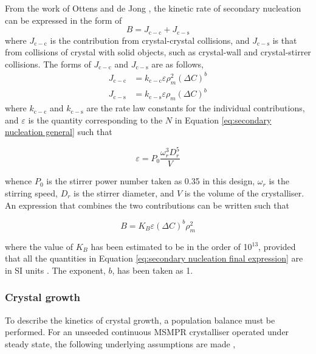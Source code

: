 From the work of Ottens and de Jong \cite{ottens_model_1974}, the kinetic rate of secondary nucleation can be expressed in the form of 
\begin{equation}
    B = J_{\mathrm{c-c}} + J_{\mathrm{c-s}}
\end{equation}
 where $J_{\mathrm{c-c}}$ is the contribution from crystal-crystal collisions, and $J_{\mathrm{c-s}}$ is that from collisions of crystal with solid objects, such as crystal-wall and crystal-stirrer collisions. The forms of $J_{\mathrm{c-c}}$ and $J_{\mathrm{c-s}}$ are as follows,
\begin{align}
    J_{\mathrm{c-c}} &= k_{\mathrm{c-c}} \varepsilon \rho_m^2 (\Delta C)^b \\
    J_{\mathrm{c-s}} &= k_{\mathrm{c-s}} \varepsilon \rho_m (\Delta C)^b
\end{align}
where $k_{\mathrm{c-c}}$ and $k_{\mathrm{c-s}}$ are the rate law constants for the individual contributions, and $\varepsilon$ is the quantity corresponding to the $N$ in Equation \ref{eq:secondary nucleation general} such that 

\begin{equation}
    \varepsilon = P_0 \frac{\omega_r^3 D_r^5}{V} 
\end{equation}

\noindent whence $P_0$ is the stirrer power number taken as 0.35 in this design, $\omega_r$ is the stirring speed, $D_r$ is the stirrer diameter, and $V$ is the volume of the crystalliser. An expression that combines the two contributions can be written such that 

\begin{equation} \label{eq:secondary nucleation final expression}
    B = K_B \varepsilon (\Delta C)^b \rho_m^2
\end{equation}

\noindent where the value of $K_B$ has been estimated to be in the order of 10$^{13}$, provided that all the quantities in Equation \ref{eq:secondary nucleation final expression} are in SI units \cite{bauer_contact_1974}. The exponent, $b$, has been taken as 1. 

\subsubsection{Crystal growth} \label{sec: crystal growth}

To describe the kinetics of crystal growth, a population balance must be performed. For an unseeded continuous MSMPR crystalliser operated under steady state, the following underlying assumptions are made \cite{richardson_chemical_2006} \cite{randolph_theory_1971},

